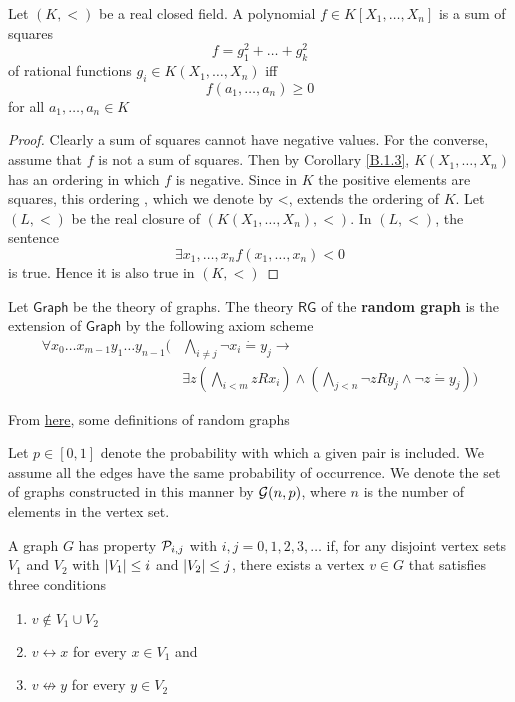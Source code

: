 \documentclass[11pt]{article}
\def \Graph {\textsf{Graph}}
\def \RG {\textsf{RG}}
\begin{document}
\begin{corollary}
Let \((K,<)\) be a real closed field. A polynomial \(f\in K[X_1,\dots,X_n]\) is a sum of squares
\begin{equation*}
f=g_1^2+\dots+g_k^2
\end{equation*}
of rational functions \(g_i\in K(X_1,\dots,X_n)\) iff
\begin{equation*}
f(a_1,\dots,a_n)\ge 0
\end{equation*}
for all \(a_1,\dots,a_n\in K\)
\end{corollary}

\begin{proof}
Clearly a sum of squares cannot have negative values. For the converse,
assume that \(f\) is not a sum of squares. Then by Corollary \ref{B.1.3}, \(K(X_1,\dots,X_n)\) has an
ordering in which \(f\) is negative. Since in \(K\) the positive elements are squares, this
ordering , which we denote by <, extends the ordering of \(K\). Let \((L,<)\) be the real closure
of \((K(X_1,\dots,X_n),<)\). In \((L,<)\), the sentence
\begin{equation*}
\exists x_1,\dots,x_n f(x_1,\dots,x_n)<0
\end{equation*}
is true. Hence it is also true in \((K,<)\)
\end{proof}

\begin{exercise}
\label{ex3.3.1}
Let \(\Graph\) be the theory of graphs. The theory \(\RG\) of the \textbf{random graph} is the extension
of \(\Graph\) by the following axiom scheme
\begin{align*}
\forall x_0\dots x_{m-1}y_1\dots y_{n-1}\Big(&\bigwedge_{i\neq j}\neg x_i\dot=y_j\to\\
&\exists z(\bigwedge_{i<m}zRx_i)\wedge(\bigwedge_{j<n}\neg zRy_j\wedge\neg z\dot=y_j)
 \Big)
\end{align*}
\end{exercise}

From \href{http://www.math.uchicago.edu/\~may/VIGRE/VIGRE2010/REUPapers/Fuchs.pdf}{here}, some definitions of random graphs

Let \(p\in[0,1]\) denote the probability with which a given pair is included. We assume all the
edges have the same probability of occurrence. We denote the set of graphs constructed in this
manner by \(\mathcal{G}(n,p)\), where \(n\) is the number of elements in the vertex set.

\begin{definition}[]
A graph \(G\) has property \(\mathcal{P}_{i,j}\) with \(i,j=0,1,2,3,\dots\) if, for any disjoint vertex
sets \(V_1\) and \(V_2\) with \(\abs{V_1}\le i\) and \(\abs{V_2}\le j\), there exists a vertex \(v\in G\)
that satisfies three conditions
\begin{enumerate}
\item \(v\not\in V_1\cup V_2\)
\item \(v\leftrightarrow x\) for every \(x\in V_1\) and
\item \(v\not\leftrightarrow y\) for every \(y\in V_2\)
\end{enumerate}
\end{definition}
\end{document}
